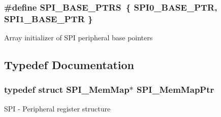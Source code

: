 \subsubsection[{S\+P\+I\+\_\+\+B\+A\+S\+E\+\_\+\+P\+T\+R\+S}]{\setlength{\rightskip}{0pt plus 5cm}\#define S\+P\+I\+\_\+\+B\+A\+S\+E\+\_\+\+P\+T\+R\+S~\{ {\bf S\+P\+I0\+\_\+\+B\+A\+S\+E\+\_\+\+P\+T\+R}, {\bf S\+P\+I1\+\_\+\+B\+A\+S\+E\+\_\+\+P\+T\+R} \}}\label{group___s_p_i___peripheral_ga3a16fecfe27c2052ab60e014be3f66f6}
Array initializer of S\+P\+I peripheral base pointers 

\subsection{Typedef Documentation}
\hypertarget{group___s_p_i___peripheral_ga7e4e9921e4d56bdbb10a04e77743ff5e}{}
\subsubsection[{S\+P\+I\+\_\+\+Mem\+Map\+Ptr}]{\setlength{\rightskip}{0pt plus 5cm}typedef struct {\bf S\+P\+I\+\_\+\+Mem\+Map}$\ast$ {\bf S\+P\+I\+\_\+\+Mem\+Map\+Ptr}}\label{group___s_p_i___peripheral_ga7e4e9921e4d56bdbb10a04e77743ff5e}
S\+P\+I -\/ Peripheral register structure 